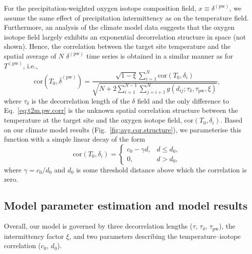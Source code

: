 \documentclass[cp, manuscript]{copernicus}
\begin{document}
For the precipitation-weighted oxygen isotope composition field, $x \equiv
\delta^{\mathrm{(pw)}}$, we assume the same effect of precipitation
intermittency as on the temperature field. Furthermore, an analysis of the
climate model data suggests that the oxygen isotope field largely exhibits
an exponential decorrelation structure in space (not shown). Hence, the
correlation between the target site temperature and the spatial average of $N$
$\delta^{\mathrm{(pw)}}$ time series is obtained in a similar manner as for
$T^{\mathrm{(pw)}}$, i.e.,
%
\begin{equation}
\label{eq:oxy.pw.corr}
\mathrm{cor}\left(T_0,
  \overline{\delta}^{\mathrm{(pw)}}\right)=
\frac
{\sqrt{1-\xi}\sum_{i=1}^{N}\mathrm{cor}\left(T_0,\delta_i\right)}
{\sqrt{N + 2\sum_{i=1}^{N-1}\sum_{j=i+1}^{N}
  g(d_{ij}; \tau_{\delta}, \tau_{\mathrm{pw}}, \xi)}},
\end{equation}
%
where $\tau_{\delta}$ is the decorrelation length of the $\delta$ field and the
only difference to Eq.~\eqref{eq:t2m.pw.corr} is the unknown spatial correlation
structure between the temperature at the target site and the oxygen isotope
field, $\mathrm{cor}\left(T_0,\delta_i\right)$.  Based on our climate model
results (Fig.~\ref{fig:avg.cor.structure}), we parameterise this function with a
simple linear decay of the form
%
\begin{equation}
\label{eq:t2m.oxy.corr}
\mathrm{cor}\left(T_0,\delta_i\right)=
\begin{cases}
  c_0 - \gamma d, & d \le d_0,\\
  0, & d > d_0,
\end{cases}
\end{equation}
%
where $\gamma=c_0/d_0$ and $d_0$ is some threshold distance above which
the correlation is zero.

\subsection{Model parameter estimation and model results}
\label{app:concept.model.estimation}

Overall, our model is governed by three decorrelation lengths ($\tau$,
$\tau_{\delta}$, $\tau_{\mathrm{pw}}$), the intermittency factor $\xi$, and two
parameters describing the temperature--isotope correlation ($c_0$, $d_0$).
\end{document}
